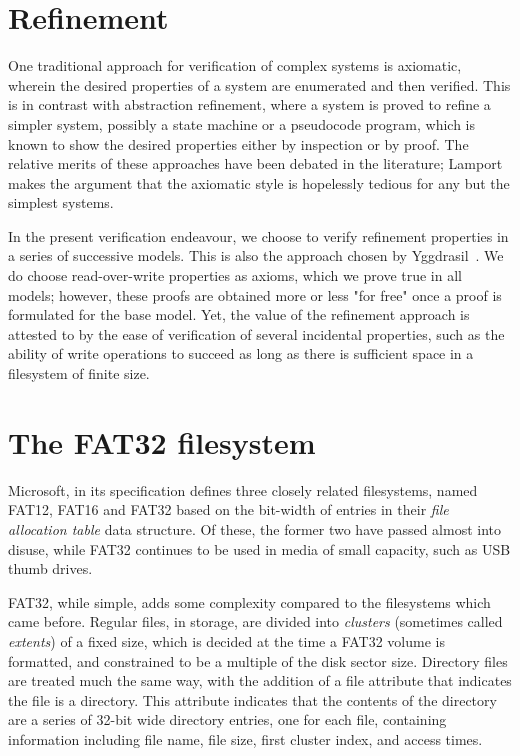 \documentclass[runningheads,a4paper]{llncs}
\begin{document}
\section{Refinement}

One traditional approach for verification of complex systems is
axiomatic, wherein the desired properties of a system are enumerated
and then verified. This is in contrast with abstraction refinement,
where a system is proved to refine a simpler system, possibly a state
machine or a pseudocode program, which is known to show the desired
properties either by inspection or by proof. The relative merits of
these approaches have been debated in the literature;
Lamport~\cite{lamport1993verification} makes the argument that the
axiomatic style is hopelessly tedious for any but the simplest
systems.

In the present verification endeavour, we choose to verify
refinement properties in a series of successive models. This is also
the approach chosen by Yggdrasil~\cite{sigurbjarnarson2016push}. We do
choose read-over-write properties as axioms, which we prove true in all
models; however, these proofs are obtained more or less "for free"
once a proof is formulated for the base model. Yet, the value of the
refinement approach is attested to by the ease of verification of
several incidental properties, such as the ability of write operations
to succeed as long as there is sufficient space in a filesystem of
finite size.

\section{The FAT32 filesystem}

Microsoft, in its specification \cite{microsoft_2000} defines three
closely related filesystems, named FAT12, FAT16 and FAT32 based on the
bit-width of entries in their \textit{file allocation table} data
structure. Of these, the former two have passed almost into disuse,
while FAT32 continues to be used in media of small capacity, such as
USB thumb drives.

FAT32, while simple, adds some complexity compared to the filesystems
which came before. Regular files, in storage, are divided into
\textit{clusters} (sometimes called \textit{extents}) of a fixed size,
which is decided at the time a FAT32 volume is formatted, and
constrained to be a multiple of the disk sector size. Directory files
are treated much the same way, with the
addition of a file attribute that indicates the file is a
directory. This attribute indicates that the contents of the directory
are a series of 32-bit wide directory entries, one for each file,
containing information including file name, file size, first cluster
index, and access times.
\end{document}
